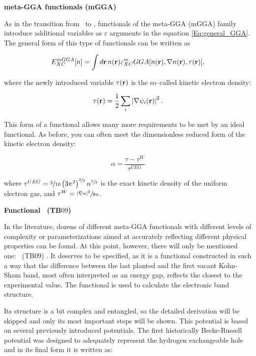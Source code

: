 \textbf{meta-GGA functionals (mGGA)}

As in the transition from \LDA\ to \GGA, functionals of the meta-GGA (mGGA) family introduce additional variables as $\varepsilon$ arguments in the equation \ref{Eq:general_GGA}.
The general form of this type of functionals can be written as

\begin{equation}
    \label{Eq:general_mGGA} 
    E_{XC}^{mGGA}[n]=\int d\mathbf{r}\, n(\mathbf{r})\varepsilon_{XC}^mGGA[n(\mathbf{r}),\nabla n(\mathbf{r}), \tau(\mathbf{r})],
\end{equation}

where the newly introduced variable $\tau(\mathbf{r})$ is the so--called kinetic electron density:

\begin{equation}
    \label{Eq:kinetic_density} 
    \tau(\mathbf{r})=\frac{1}{2}\sum_i\left|\nabla\psi_i(\mathbf{r})\right|^2.
\end{equation}

This form of a functional allows many more requirements to be met by an ideal functional.
As before, you can often meet the dimensionless reduced form of the kinetic electron density:

\begin{equation}
    \label{Eq:kinetic_density_alpha} 
    \alpha=\frac{\tau-\tau^W}{\tau^{UEG}}
\end{equation}

where $\tau^{UEG}=\sfrac{3}{10}\left(3\pi^2\right)^{\sfrac{2}{3}}n^{\sfrac{5}{3}}$ is the exact kinetic density of the uniform electron gas, and $\tau^{W}=\sfrac{|\nabla n|^2}{8n}$.

\textbf{Functional \mBJLDA\ (TB$09$)}

In the literature, dozens of different meta-GGA functionals with different levels of complexity or parameterizations aimed at accurately reflecting different physical properties can be found.
At this point, however, there will only be mentioned one: \mBJLDA\ (TB$09$) \cite{mBJLDA2}.
It deserves to be specified, as it is a functional constructed in such a way that the difference between the last planted and the first vacant Kohn-Sham band, most often interpreted as an energy gap, reflects the closest to the experimental value.
The functional is used to calculate the electronic band structure.

Its structure is a bit complex and entangled, so the detailed derivation will be skipped and only its most important steps will be shown. This potential is based on several previously introduced potentials.
The first historically Becke-Russell potential \cite{becke_roussel} was designed to adequately represent the hydrogen exchangeable hole and in its final form it is written as:

